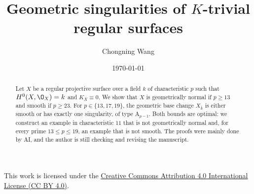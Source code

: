 \documentclass{article}
\title{Geometric singularities of $K$-trivial regular surfaces}
\author{Chongning Wang}
\date{\today}
\begin{document}
\maketitle

\begin{abstract}
Let $X$ be a regular projective surface over a field $k$ of characteristic $p$ such that $H^0(X,\O_X) = k$ and $K_X\equiv 0$.
We show that $X$ is geometrically normal if $p\geq 13$ and smooth if $p\geq 23$.
For $p\in\{13,17,19\}$, the geometric base change $X_{\bar k}$ is either smooth or has exactly one singularity, of type $\mathrm A_{p-1}$.
Both bounds are optimal: we construct an example in characteristic $11$ that is not geometrically normal and, for every prime $13\le p\leq 19$, an example that is not smooth.
The proofs were mainly done by AI, and the author is still checking and revising the manuscript.
\end{abstract}
\tableofcontents














\appendix




\par\bigskip
{\footnotesize\noindent
This work is licensed under the
\href{https://creativecommons.org/licenses/by/4.0/}{Creative Commons Attribution 4.0 International License (CC BY 4.0)}.\par}
\end{document}
